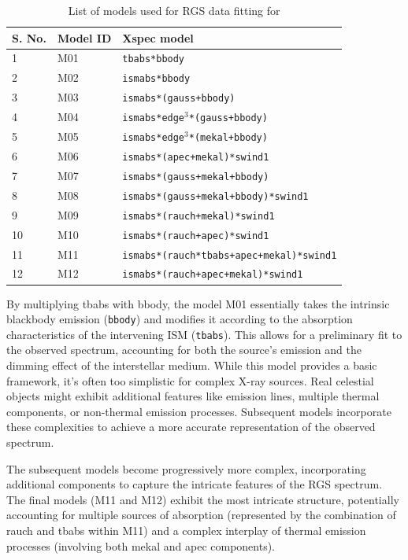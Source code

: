 			\begin{table}[!htb]
				\centering
				\caption{List of models used for RGS data fitting for \source}
				\label{xmm-rgs-model-list}
				\begin{tabular}{lll}
					\hline
					\textbf{S. No.} & \textbf{Model ID} & \textbf{Xspec model} \\ \hline
					{1} & {M01} & \texttt{tbabs*bbody} \\ %
					{2} & {M02} & \texttt{ismabs*bbody} \\ %
					{3} & {M03} & \texttt{ismabs*(gauss+bbody)} \\ %
					{4} & {M04} & \texttt{ismabs*edge$^3$*(gauss+bbody)} \\ %
					{5} & {M05} & \texttt{ismabs*edge$^3$*(mekal+bbody)} \\ %
					{6} & {M06} & \texttt{ismabs*(apec+mekal)*swind1} \\ %
					{7} & {M07} & \texttt{ismabs*(gauss+mekal+bbody)} \\ %
					{8} & {M08} & \texttt{ismabs*(gauss+mekal+bbody)*swind1} \\ %
					{9} & {M09} & \texttt{ismabs*(rauch+mekal)*swind1} \\ %
					{10} & {M10} & \texttt{ismabs*(rauch+apec)*swind1} \\ %
					{11} & {M11} & \texttt{ismabs*(rauch*tbabs+apec+mekal)*swind1} \\ %
					{12} & {M12} & \texttt{ismabs*(rauch+apec+mekal)*swind1} \\ \hline
				\end{tabular}
			\end{table}
			
			By multiplying tbabs with bbody, the model M01 essentially takes the intrinsic blackbody emission (\texttt{bbody}) and modifies it according to the absorption characteristics of the intervening ISM (\texttt{tbabs}).  This allows for a preliminary fit to the observed spectrum, accounting for both the source's emission and the dimming effect of the interstellar medium. While this model provides a basic framework,  it's often too simplistic for complex X-ray sources. Real celestial objects might exhibit additional features like emission lines, multiple thermal components, or non-thermal emission processes. Subsequent models incorporate these complexities to achieve a more accurate representation of the observed spectrum.
			
			The subsequent models become progressively more complex, incorporating additional components to capture the intricate features of the RGS spectrum. The final models (M11 and M12) exhibit the most intricate structure, potentially accounting for multiple sources of absorption (represented by the combination of rauch and tbabs within M11) and a complex interplay of thermal emission processes (involving both mekal and apec components).
			
